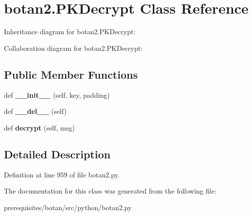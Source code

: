 \hypertarget{classbotan2_1_1_p_k_decrypt}{}\section{botan2.\+P\+K\+Decrypt Class Reference}
\label{classbotan2_1_1_p_k_decrypt}


Inheritance diagram for botan2.\+P\+K\+Decrypt\+:


Collaboration diagram for botan2.\+P\+K\+Decrypt\+:
\subsection*{Public Member Functions}
\begin{DoxyCompactItemize}
\item 
\mbox{\label{classbotan2_1_1_p_k_decrypt_aec23cef661ca917a27f5f8369743e244}} 
def {\bfseries \+\_\+\+\_\+init\+\_\+\+\_\+} (self, key, padding)
\item 
\mbox{\label{classbotan2_1_1_p_k_decrypt_a642662590d94182d21f74a53b5c2ee10}} 
def {\bfseries \+\_\+\+\_\+del\+\_\+\+\_\+} (self)
\item 
\mbox{\label{classbotan2_1_1_p_k_decrypt_aa5bea8d1eccd696478eaf2b31f8c45aa}} 
def {\bfseries decrypt} (self, msg)
\end{DoxyCompactItemize}


\subsection{Detailed Description}


Definition at line 959 of file botan2.\+py.



The documentation for this class was generated from the following file\+:\begin{DoxyCompactItemize}
\item 
prerequisites/botan/src/python/botan2.\+py\end{DoxyCompactItemize}
